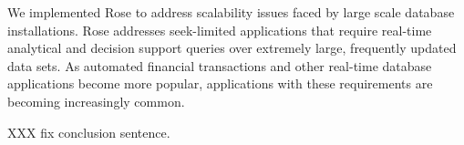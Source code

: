 \documentclass{vldb}
\newcommand{\rows}{Rose\xspace}
\begin{document}
We implemented \rows to address scalability issues faced by large
scale database installations.  \rows addresses seek-limited
applications that require real-time analytical and decision
support queries over extremely large, frequently updated data sets.
As automated financial transactions and other real-time database
applications become more popular,
applications with these requirements are becoming increasingly common.

XXX fix conclusion sentence.


%
%
\balancecolumns %
\end{document}
